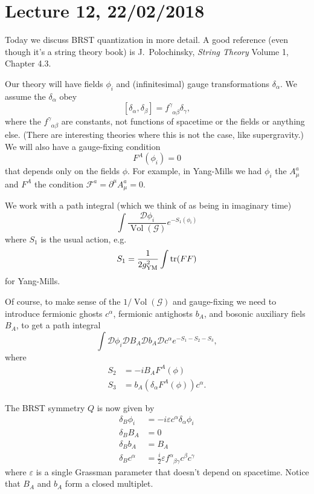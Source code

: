 \section*{Lecture 12, 22/02/2018}
Today we discuss BRST quantization in more detail.
A good reference (even though it's a string theory book) is J.~Polochinsky, \emph{String Theory} Volume 1, Chapter 4.3.

Our theory will have fields $\phi_i$ and (infinitesimal) gauge transformations $\delta_\alpha$.
We assume the $\delta_\alpha$ obey
\[
[ \delta_\alpha, \delta_\beta] = f^{\gamma}_{\phantom{\gamma}\alpha \beta} \delta_\gamma,
\]
where the $f^{\gamma}_{\phantom{\gamma}\alpha \beta}$ are constants, not functions of spacetime or the fields or anything else.
(There are interesting theories where this is not the case, like supergravity.)
We will also have a gauge-fixing condition
\[
F^A(\phi_i) = 0
\]
that depends only on the fields $\phi$.
For example, in Yang-Mills we had $\phi_i$ the $A_\mu^a$ and $F^A$ the condition $\mathcal F^a = \partial^\mu A_\mu^a = 0$.

We work with a path integral (which we think of as being in imaginary time)
\[
\int \frac{\mathcal D \phi_i}{\operatorname{Vol}(\mathcal G)} e^{-S_1(\phi_i)}
\]
where $S_1$ is the usual action, e.g.
\[
S_1 = \frac{1}{2 g^2_{\text{YM}}} \int \operatorname{tr}(FF)
\]
for Yang-Mills.

Of course, to make sense of the $1/\operatorname{Vol}(\mathcal G)$ and gauge-fixing we need to introduce fermionic ghosts $c^\alpha$, fermionic antighosts $b_A$, and bosonic auxiliary fiels $B_A$, to get a path integral
\[
\int \mathcal D \phi_i \mathcal D B_A \mathcal D b_A \mathcal D c^\alpha e^{- S_1 - S_2 - S_3},
\]
where
\begin{align*}
S_2 &= -i B_A F^A(\phi)\\
S_3 &= b_A(\delta_\alpha F^A(\phi))c^\alpha.
\end{align*}

The BRST symmetry $Q$ is now given by
\begin{align*}
\delta_B \phi_i &= -i \varepsilon c^\alpha \delta_\alpha \phi_i\\
\delta_B B_A &= 0\\
\delta_B b_A &= B_A\\
\delta_B c^\alpha &= \frac{i}{2} \varepsilon f^{\alpha}_{\phantom{\alpha} \beta \gamma} c^\beta c^\gamma
\end{align*}
where $\varepsilon$ is a single Grassman parameter that doesn't depend on spacetime.
Notice that $B_A$ and $b_A$ form a closed multiplet.

